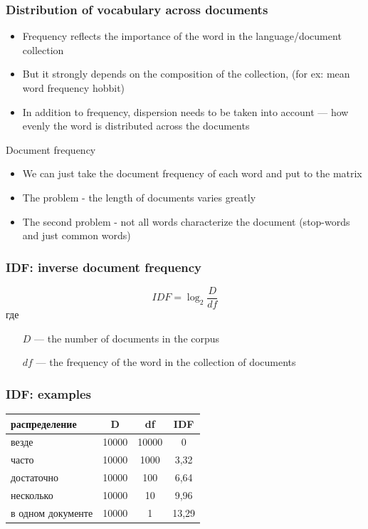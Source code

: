 \documentclass[svgnames]{beamer}
\begin{document}
\begin{frame}
  \frametitle{Distribution of vocabulary across documents}
  \begin{itemize}
  \item Frequency reflects the importance of the word in the language/document collection
  \item But it strongly depends on the composition of the collection, (for ex: mean word frequency \alert{hobbit})
  \item In addition to frequency, \alert{dispersion} needs to be taken into account —
    how evenly the word is distributed across the documents
  \end{itemize}
\end{frame}


\begin{frame}{Document frequency}
    \begin{itemize}
  \item We can just take the document frequency of each word and put to the matrix
  \item The problem - the length of documents varies greatly
  \item The second problem - not all words characterize the document (stop-words and just common words)

\end{itemize}
    \end{frame}

\begin{frame}
  \frametitle{IDF: inverse document frequency}
  \begin{equation}
    IDF=\log_2\frac{D}{df}
  \end{equation}
  где
  \begin{itemize}
  \item[$D$] — the number of documents in the corpus
  \item[$df$] — the frequency of the word in the collection of documents
  \end{itemize}
\end{frame}

\begin{frame}
  \frametitle{IDF: examples}
  \begin{tabular}[l]{lccc}
    распределение & D & df & IDF \\
    \hline
    везде & 10000 & 10000 & 0 \\
    часто & 10000 & 1000 & 3,32 \\
    достаточно & 10000 & 100 & 6,64 \\
    несколько & 10000 & 10 & 9,96 \\
    в одном документе & 10000 & 1 & 13,29 \\
  \end{tabular}
\end{frame}
\end{document}
